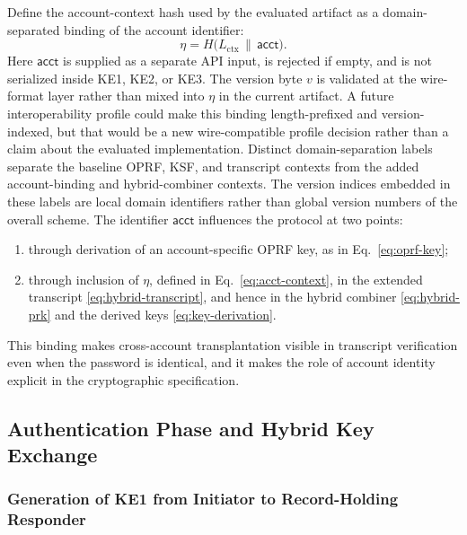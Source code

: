 \documentclass[preprint,12pt]{elsarticle}
\newcommand{\acct}{\mathsf{acct}}
\newcommand{\Label}[1]{L_{\mathrm{#1}}}
\theoremstyle{remark}
\begin{document}
Define the account-context hash used by the evaluated artifact as a
domain-separated binding of the account identifier:
\begin{equation}
  \eta =
  H\!\bigl(
    \Label{ctx} \,\|\, \acct
  \bigr).
  \label{eq:acct-context}
\end{equation}
Here $\acct$ is supplied as a separate API input, is rejected if empty,
and is not serialized inside KE1, KE2, or KE3. The version byte $v$ is
validated at the wire-format layer rather than mixed into $\eta$ in the
current artifact. A future interoperability profile could make this
binding length-prefixed and version-indexed, but that would be a new
wire-compatible profile decision rather than a claim about the evaluated
implementation.
Distinct domain-separation labels separate the baseline OPRF, KSF, and
transcript contexts from the added account-binding and hybrid-combiner
contexts. The version indices embedded in these labels are local domain
identifiers rather than global version numbers of the overall scheme.
The identifier $\acct$ influences the protocol at two points:
\begin{enumerate}
  \item through derivation of an account-specific OPRF key, as in
        Eq.~\eqref{eq:oprf-key};
  \item through inclusion of $\eta$, defined in
        Eq.~\eqref{eq:acct-context}, in the extended transcript
        \eqref{eq:hybrid-transcript}, and hence in the hybrid combiner
        \eqref{eq:hybrid-prk} and the derived keys
        \eqref{eq:key-derivation}.
\end{enumerate}
This binding makes cross-account transplantation visible in transcript
verification even when the password is identical, and it makes the role
of account identity explicit in the cryptographic specification.

\subsection{Authentication Phase and Hybrid Key Exchange}

\subsubsection{Generation of KE1 from Initiator to Record-Holding Responder}
\end{document}
